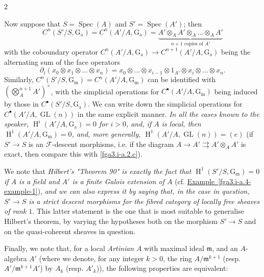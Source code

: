 \begin{example}{2}
\begin{enumerate}
    \end{enumerate}\par{}Now suppose that \(S=\operatorname {Spec}(A)\) and \(S'=\operatorname {Spec}(A')\);
    then
    \[       C^n(S'/S,\operatorname {G_a})       = C^n(A'/A,\operatorname {G_a})       = \underbrace {A'\otimes _A A'\otimes _A\ldots \otimes _A A'}_{n+1\text { copies of }A'}     \]
    with the coboundary operator \(C^n(A'/A,\operatorname {G_a})\to  C^{n+1}(A'/A,\operatorname {G_a})\) being the alternating sum of the face operators
    \[       \partial _i(x_0\otimes  x_1\otimes \ldots \otimes  x_n)       = x_0\otimes \ldots \otimes  x_{i-1}\otimes 1_{A'}\otimes  x_i\otimes \ldots \otimes  x_n.     \]
    Similarly, \(C^n(S'/S,\operatorname {G_m})=C^n(A'/A,\operatorname {G_m})\) can be identified with \((\bigotimes _A^{n+1}A')^\times \), with the simplicial operations for \(C^\bullet (A'/A,\operatorname {G_m})\) being induced by those in \(C^\bullet (S'/S,\operatorname {G_a})\).
    We can write down the simplicial operations for \(C^\bullet (A'/A,\operatorname {GL}(n))\) in the same explicit manner.
    \emph{In all the cases known to the speaker, \(\operatorname {H}^i(A'/A,\operatorname {G_a})=0\) for \(i>0\), and, if \(A\) is local, then \(\operatorname {H}^1(A'/A,\operatorname {G_m})=0\), and, more generally, \(\operatorname {H}^1(A'/A,\operatorname {GL}(n))=(e)\)} (if \(S'\to  S\) is an \(\mathcal {F}\)-descent morphisms, i.e. if the diagram \(A\to  A'\rightrightarrows  A'\otimes _A A'\) is exact, then compare this with \cref{fga3.i-a.2.c}).
    
    We note that \emph{Hilbert's "Theorem 90" is exactly the fact that \(\operatorname {H}^1(S'/S,\operatorname {G_m})=0\) if \(A\) is a field and \(A'\) is a finite Galois extension of \(A\)} (cf. \hyperref[fga3.i-a.4-example-1]{Example~\ref*{fga3.i-a.4-example-1}}), \emph{and we can also express it by saying that, in the case in question, \(S'\to  S\) is a strict descent morphisms for the fibred category of locally free sheaves of rank \(1\)}.
    This latter statement is the one that is most suitable to generalise Hilbert's theorem, by varying the hypotheses both on the morphism \(S'\to  S\) and on the quasi-coherent sheaves in question.\par{}Finally, we note that, for a local \emph{Artinian} \(A\) with maximal ideal \(\mathfrak {m}\), and an \(A\)-algebra \(A'\) (where we denote, for any integer \(k>0\), the ring \(A/\mathfrak {m}^{k+1}\) (resp. \(A'/\mathfrak {m}^{k+1}A'\)) by \(A_k\) (resp. \(A'_k\))), the following properties are equivalent:


\end{example}
